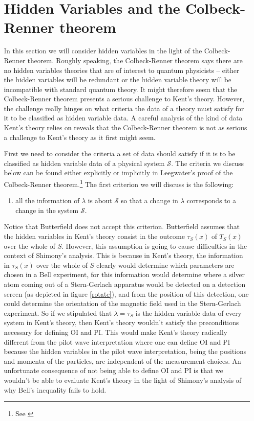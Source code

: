 
\section{Hidden Variables and the Colbeck-Renner theorem\label{colbeckrennerthm}}
In this section we will consider hidden variables in the light of the Colbeck-Renner theorem. Roughly speaking, the Colbeck-Renner theorem says there are no hidden variables theories that are of interest to quantum physicists -- either the hidden variables will be redundant or the hidden variable theory will be incompatible with standard quantum theory. It might therefore seem that the Colbeck-Renner theorem presents a serious challenge to Kent's theory. However, the challenge really hinges on what criteria the data of a theory must satisfy for it to be classified as hidden variable data. A careful analysis of the kind of data Kent's theory relies on reveals that the Colbeck-Renner theorem is not as serious a challenge to Kent's theory as it first might seem. 

First we need to consider the criteria a set of data should satisfy if it is to be classified as hidden variable data of a physical system $\mathcal{S}$. The criteria we discuss below can be found either explicitly or implicitly in Leegwater's proof of the Colbeck-Renner theorem.\footnote{See \cite{LeegwaterGijs2016Aitf}} The first criterion we will discuss is the following:
\begin{enumerate}
	\item all the information of $\lambda$ is about $\mathcal{S}$ so that a change in $\lambda$ corresponds to a change in the system $\mathcal{S}$.\label{hidden1}
\end{enumerate} 
Notice that Butterfield does not accept this criterion. Butterfield assumes that the hidden variables in Kent's theory consist in the outcome $\tau_S(x)$ of $T_S(x)$ over the whole of $S$. However, this assumption is going to cause difficulties in the context of Shimony's analysis. This is because in Kent's theory, the information in $\tau_S(x)$ over the whole of $S$ clearly would determine which parameters are chosen in a Bell experiment, for this information would determine where a silver atom coming out of a Stern-Gerlach apparatus would be detected on a detection screen (as depicted in figure \ref{rotate}), and from the position of this detection, one could determine the orientation of the magnetic field used in the Stern-Gerlach experiment. So if we stipulated that $\lambda=\tau_S$ is the hidden variable data of every system in Kent's theory, then Kent's theory wouldn't satisfy the preconditions necessary for defining OI and PI. This would make Kent's theory radically different from the pilot wave interpretation where one can define OI and PI because the hidden variables in the pilot wave interpretation, being the positions and momenta of the particles, are independent of the measurement choices. An unfortunate consequence of not being able to define OI and PI is that we wouldn't be able to evaluate Kent's theory in the light of Shimony's analysis of why Bell's inequality fails to hold. 

